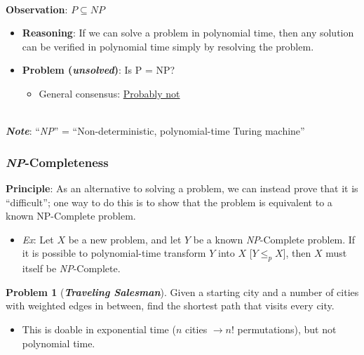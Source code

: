 \documentclass[12pt]{extarticle}
\theoremstyle{definition}
\newtheorem*{problem}{Problem}
\theoremstyle{remark}
\newcommand{\probname}[1]{\noindent \textbf{\textit{#1}}}
\begin{document}
{~\\
\noindent\textbf{Observation}: $P\subseteq NP$
\begin{itemize}
    \item \textbf{Reasoning}: If we can solve a problem in polynomial time, then any solution can be verified in polynomial time simply by resolving the problem.
    \item \textbf{Problem (\textit{unsolved})}: Is P = NP? \begin{itemize}
        \item General consensus: \ul{Probably not}
    \end{itemize}
\end{itemize}

~\\
\noindent\textbf{\textit{Note}}: ``\textit{NP}'' = ``Non-deterministic, polynomial-time Turing machine''

\pagebreak
\subsubsection{\textit{NP}-Completeness}
\textbf{Principle}: As an alternative to solving a problem, we can instead prove that it is “difficult”; one way to do this is to show that the problem is equivalent to a known NP-Complete problem.\begin{itemize}
    \item \textit{Ex}: Let $X$ be a new problem, and let $Y$ be a known \textit{NP}-Complete problem. If it is possible to polynomial-time transform $Y$ into $X$ [$Y\leq_pX$], then $X$ must itself be \textit{NP}-Complete.
\end{itemize}

\vspace{6pt}
\begin{problem}[\probname{Traveling Salesman}]
    Given a starting city and a number of cities with weighted edges in between, find the shortest path that visits every city.\begin{itemize}
        \item This is doable in exponential time ($n$ cities $\to n!$ permutations), but not polynomial time.
    \end{itemize}
\end{problem}

}
\end{document}
